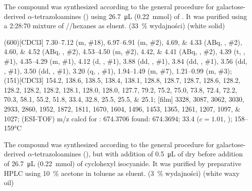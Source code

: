 The compound was synthesized according to the general procedure for galactose-derived $\alpha$-tetrazoloamines () using \SI{26.7}{\micro\liter} (\SI{0.22}{\milli\mol}) of .
It was purified using a 2:28:70 mixture of //hexanes as eluent.
(\SI{33}{\percent} wydajności) (white solid)

\begin{fullexp}
	\NMR(600)[CDCl3] \numrange{7.30}{7.12} (m, \#{18}), \numrange{6.97}{6.91} (m, \#{2}), \numlist{4.69;4.33} (ABq, , \#{2}), \numlist{4.60;4.52} (ABq, , \#{2}), \numrange{4.53}{4.50} (m, \#{2}), \numlist{4.42;4.41} (ABq, , \#{2}), \num{4.39} (t, , \#{1}), \numrange{4.35}{4.29} (m, \#{1}), \num{4.12} (d, , \#{1}), \num{3.88} (dd, , \#{1}), \num{3.84} (dd, , \#{1}), \num{3.56} (dd, , \#{1}), \num{3.50} (dd, , \#{1}), \num{3.20} (q, , \#{1}), \numrange{1.94}{1.49} (m, \#{7}), \numrange{1.21}{0.99} (m, \#{3});
	(151)[CDCl3] \numlist{154.2; 138.6; 138.5; 138.4; 138.1; 128.8; 128.7; 128.7; 128.6; 128.2; 128.2; 128.2; 128.2; 128.1; 128.0; 128.0; 127.7; 79.2; 75.2; 75.0; 73.8; 72.4; 72.2; 70.3; 58.1; 55.2; 51.8; 33.4; 32.8; 25.5; 25.5; 25.1};
	[film] \numlist{3328; 3087; 3062; 3030; 2933; 2860; 1952; 1872; 1811; 1670; 1604; 1496; 1453; 1365; 1261; 1207; 1097; 1027};
	 (ESI-TOF) m/z calcd for : \num{674.3706} found: \num{674.3694};
	\data{[$\alpha^{23}_D$]~$=$} \num{33.4} ($c = 1.01$, );
	 \numrange{158}{159}\si{\celsius}
\end{fullexp}

The compound was synthesized according to the general procedure for galactose-derived $\alpha$-tetrazoloamines (),
but with addition of \SI{0.5}{\micro\liter} of dry  before addition of \SI{26.7}{\micro\liter} (\SI{0.22}{\milli\mol}) of cyclohexyl isocyanide.
It was purified by preparative HPLC using \SI{10}{\percent}  acetone in toluene as eluent.
(\SI{3}{\percent} wydajności) (white waxy oil)

